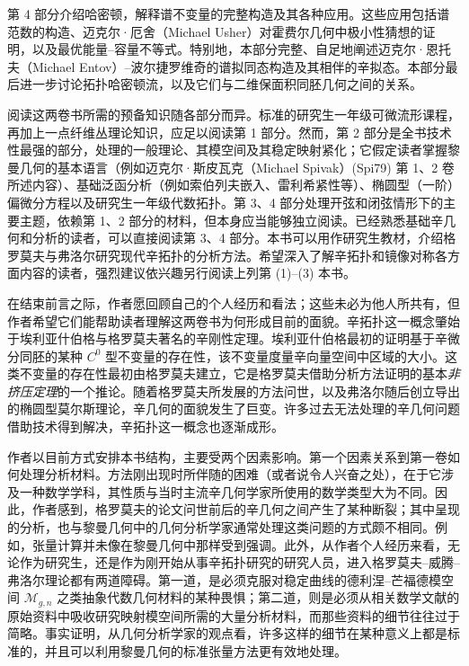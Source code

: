 第 4 部分介绍哈密顿\termFloerHomology，解释谱不变量的完整构造及其各种应用。这些应用包括谱范数的构造、迈克尔·厄舍（Michael Usher）对霍费尔几何中极小性猜想的证明，以及最优能量--容量不等式。特别地，本部分完整、自足地阐述迈克尔·恩托夫（Michael Entov）--波尔捷罗维奇的谱拟同态构造及其相伴的辛拟态。本部分最后进一步讨论拓扑哈密顿流，以及它们与二维保面积同胚几何之间的关系。

阅读这两卷书所需的预备知识随各部分而异。标准的研究生一年级可微流形课程，再加上一点纤维丛理论知识，应足以阅读第 1 部分。然而，第 2 部分是全书技术性最强的部分，处理\termPseudoholomorphicCurve{}的一般理论、其模空间及其稳定映射紧化；它假定读者掌握黎曼几何的基本语言（例如迈克尔·斯皮瓦克（Michael Spivak）(Spi79) 第 1、2 卷所述内容）、基础泛函分析（例如索伯列夫嵌入、雷利希紧性等）、椭圆型（一阶）偏微分方程以及研究生一年级代数拓扑。第 3、4 部分处理开弦和闭弦情形下\termFloerHomology{}的主要主题，依赖第 1、2 部分的材料，但本身应当能够独立阅读。已经熟悉基础辛几何和\termPseudoholomorphicCurve{}分析的读者，可以直接阅读第 3、4 部分。本书可以用作研究生教材，介绍格罗莫夫与弗洛尔研究现代辛拓扑的分析方法。希望深入了解辛拓扑和镜像对称各方面内容的读者，强烈建议依兴趣另行阅读上列第 (1)--(3) 本书。

在结束前言之际，作者愿回顾自己的个人经历和看法；这些未必为他人所共有，但作者希望它们能帮助读者理解这两卷书为何形成目前的面貌。辛拓扑这一概念肇始于埃利亚什伯格与格罗莫夫著名的辛刚性定理。埃利亚什伯格最初的证明基于辛微分同胚的某种 $C^0$ 型不变量的存在性，该不变量度量辛向量空间中区域的大小。这类不变量的存在性最初由格罗莫夫建立，它是格罗莫夫借助\termPseudoholomorphicCurve{}分析方法证明的基本\emph{非挤压定理}的一个推论。随着格罗莫夫所发展的\termPseudoholomorphicCurve{}方法问世，以及弗洛尔随后创立导出\termFloerHomology{}的椭圆型莫尔斯理论，辛几何的面貌发生了巨变。许多过去无法处理的辛几何问题借助\termPseudoholomorphicCurve{}技术得到解决，辛拓扑这一概念也逐渐成形。

作者以目前方式安排本书结构，主要受两个因素影响。第一个因素关系到第一卷如何处理分析材料。\termPseudoholomorphicCurve{}方法刚出现时所伴随的困难（或者说令人兴奋之处），在于它涉及一种数学学科，其性质与当时主流辛几何学家所使用的数学类型大为不同。因此，作者感到，格罗莫夫的论文问世前后的辛几何之间产生了某种断裂；其中呈现的分析，也与黎曼几何中的几何分析学家通常处理这类问题的方式颇不相同。例如，张量计算并未像在黎曼几何中那样受到强调。此外，从作者个人经历来看，无论作为研究生，还是作为刚开始从事辛拓扑研究的研究人员，进入格罗莫夫--威腾--弗洛尔理论都有两道障碍。第一道，是必须克服对稳定曲线的德利涅--芒福德模空间 $\mathcal M_{g,n}$ 之类抽象代数几何材料的某种畏惧；第二道，则是必须从相关数学文献的原始资料中吸收研究\termPseudoholomorphicCurve{}映射模空间所需的大量分析材料，而那些资料的细节往往过于简略。事实证明，从几何分析学家的观点看，许多这样的细节在某种意义上都是标准的，并且可以利用黎曼几何的标准张量方法更有效地处理。

